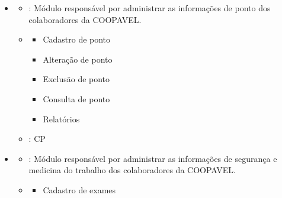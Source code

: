 \documentclass[letterpaper,10pt,brazil]{sphinxmanual}
\begin{document}
\begin{itemize}
\item {} \begin{description}
\begin{itemize}
\item {} 
\sphinxAtStartPar
{}: Módulo responsável por administrar as informações de ponto dos colaboradores da COOPAVEL.

\item {} \begin{description}
\begin{itemize}
\item {} 
\sphinxAtStartPar
Cadastro de ponto

\item {} 
\sphinxAtStartPar
Alteração de ponto

\item {} 
\sphinxAtStartPar
Exclusão de ponto

\item {} 
\sphinxAtStartPar
Consulta de ponto

\item {} 
\sphinxAtStartPar
Relatórios

\end{itemize}

\end{description}

\item {} 
\sphinxAtStartPar
{}: CP

\end{itemize}

\end{description}

\item {} \begin{description}
\begin{itemize}
\item {} 
\sphinxAtStartPar
{}: Módulo responsável por administrar as informações de segurança e medicina do trabalho dos colaboradores da COOPAVEL.

\item {} \begin{description}
\begin{itemize}
\item {} 
\sphinxAtStartPar
Cadastro de exames


\end{itemize}
\end{description}
\end{itemize}
\end{description}
\end{itemize}
\end{document}

